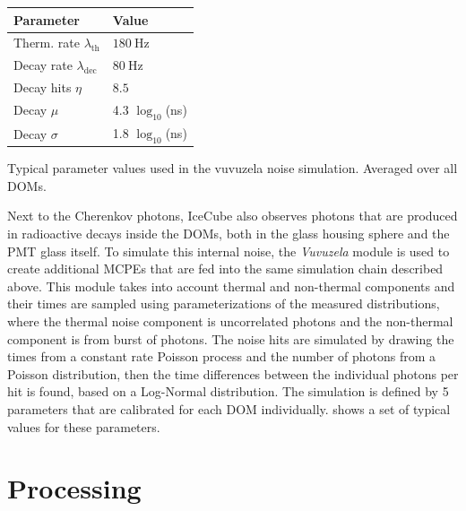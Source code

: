 \begin{margintable}
\small
    \begin{tabular}{ ll }
    \hline\hline

    \textbf{Parameter} & \textbf{Value} \\ 

    \hline\hline

    Therm. rate $\lambda_\mathrm{th}$ & $\SI{180}{\hertz}$ \\
    Decay rate $\lambda_\mathrm{dec}$ & $\SI{80}{\hertz}$ \\
    Decay hits $\eta$ &  $8.5$ \\
    Decay $\mu$ & 4.3 $\log_{10}$(\si{\nano\second}) \\
    Decay $\sigma$ & 1.8 $\log_{10}$(\si{\nano\second}) \\

    \hline
    \end{tabular}
\caption[Vuvuzela noise simulation parameters]{Typical parameter values used in the vuvuzela noise simulation. Averaged over all DOMs.}
\end{margintable}

Next to the Cherenkov photons, IceCube also observes photons that are produced in radioactive decays inside the DOMs, both in the glass housing sphere and the PMT glass itself. To simulate this internal noise, the \emph{Vuvuzela} module  is used to create additional MCPEs that are fed into the same simulation chain described above. This module takes into account thermal and non-thermal components and their times are sampled using parameterizations of the measured distributions, where the thermal noise component is uncorrelated photons and the non-thermal component is from burst of photons. The noise hits are simulated by drawing the times from a constant rate Poisson process and the number of photons from a Poisson distribution, then the time differences between the individual photons per hit is found, based on a Log-Normal distribution. The simulation is defined by 5 parameters that are calibrated for each DOM individually.  shows a set of typical values for these parameters.


\section{Processing}

